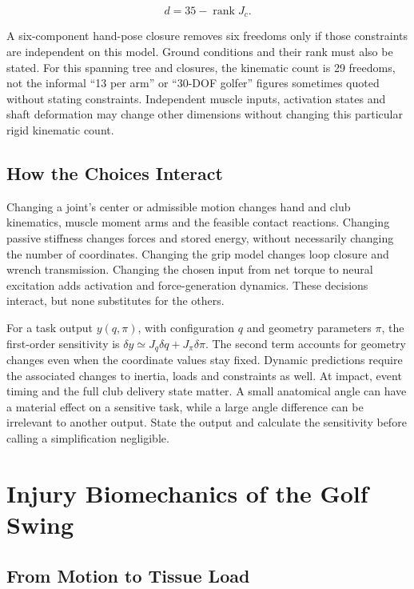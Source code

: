 \[
d=35-\operatorname{rank}J_c.
\]

A six-component hand-pose closure removes six freedoms only if those constraints are independent on this model. Ground conditions and their rank must also be stated. For this spanning tree and closures, the kinematic count is 29 freedoms, not the informal ``13 per arm'' or ``30-DOF golfer'' figures sometimes quoted without stating constraints. Independent muscle inputs, activation states and shaft deformation may change other dimensions without changing this particular rigid kinematic count.

\subsection{How the Choices Interact}\label{how-the-choices-interact}

Changing a joint's center or admissible motion changes hand and club kinematics, muscle moment arms and the feasible contact reactions. Changing passive stiffness changes forces and stored energy, without necessarily changing the number of coordinates. Changing the grip model changes loop closure and wrench transmission. Changing the chosen input from net torque to neural excitation adds activation and force-generation dynamics. These decisions interact, but none substitutes for the others.

For a task output \(y(q,\pi)\), with configuration \(q\) and geometry parameters \(\pi\), the first-order sensitivity is \(\delta y\simeq J_q\delta q+J_\pi\delta\pi\). The second term accounts for geometry changes even when the coordinate values stay fixed. Dynamic predictions require the associated changes to inertia, loads and constraints as well. At impact, event timing and the full club delivery state matter. A small anatomical angle can have a material effect on a sensitive task, while a large angle difference can be irrelevant to another output. State the output and calculate the sensitivity before calling a simplification negligible.

\section{Injury Biomechanics of the Golf Swing}\label{sec-ch22_injury}\label{sec:ch22_injury}

\subsection{From Motion to Tissue Load}\label{from-motion-to-tissue-load}

